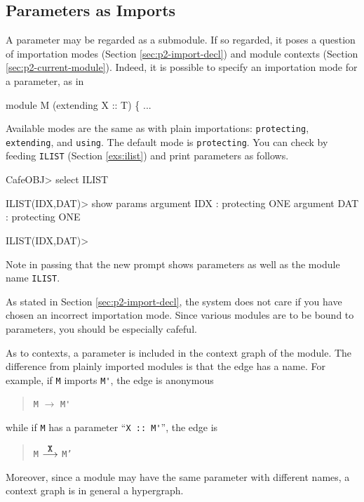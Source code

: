 \documentclass[a4paper]{memoir}
\begin{document}
\subsection{Parameters as Imports}\label{sec:p2-params-as-subs}

A parameter may be regarded as a submodule. If so regarded,
it poses a question of importation modes (Section \ref{sec:p2-import-decl})
and module contexts (Section \ref{sec:p2-current-module}).
Indeed, it is possible to specify an importation mode for a parameter, as in
\begin{vvtm}
\begin{ccode}
  module M (extending X :: T) \{ ...
\end{ccode}
\end{vvtm}
Available modes are the same as with plain importations: \verb|protecting|,
\verb|extending|, and \verb|using|. The default mode is \verb|protecting|.
You can check by feeding \verb|ILIST| (Section \ref{exs:ilist}) and
print parameters as follows.
\begin{vvtm}
\begin{ccode}
  CafeOBJ> select ILIST

  ILIST(IDX,DAT)> show params
  argument IDX : protecting ONE
  argument DAT : protecting ONE

  ILIST(IDX,DAT)> 
\end{ccode}
\end{vvtm}
Note in passing that the new prompt shows parameters as well as the module
name \verb|ILIST|.


\begin{warning}
  As stated in Section \ref{sec:p2-import-decl}, the system does not
  care if you have chosen an incorrect importation mode. Since
  various modules are to be bound to parameters, you should be especially
  cafeful.
\end{warning}

As to contexts, a parameter is included in the context graph of the module.
The difference from plainly imported modules is that the edge has
a name. For example, if \verb|M| imports \verb|M'|, the edge is anonymous
\begin{quotation}
  \verb|M| $\longrightarrow$ \verb|M'|
\end{quotation}
while if \verb|M| has a parameter ``\verb|X :: M'|'', the edge is
\begin{quotation}
  \texttt{M} $\buildrel \mbox{\texttt{X}} \over \longrightarrow$ \texttt{M'}
\end{quotation}
Moreover, since a module may have the same parameter with different names,
a context graph is in general a hypergraph.
\end{document}
